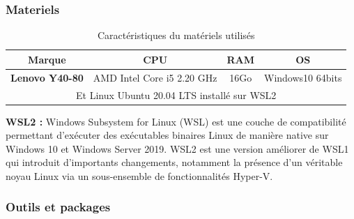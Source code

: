 \subsubsection{Materiels}

\begin{table}[H]
  \centering
  \begin{tabular}{cccc}
    \toprule
     \textbf{Marque} & \textbf{CPU} & \textbf{RAM} & \textbf{OS} \\
     \midrule
       \textbf{Lenovo Y40-80} & AMD Intel Core i5 2.20 GHz & 16Go & Windows10 64bits \\ \hline
       \multicolumn{4}{m{14cm}}{\centering Et Linux Ubuntu 20.04 LTS installé sur WSL2 }\\
    \bottomrule
  \end{tabular}
  \caption{Caractéristiques du matériels utilisés}
  \label{tabmat}
\end{table}

\textbf{WSL2 :} Windows Subsystem for Linux (WSL) est une couche de compatibilité permettant d'exécuter des exécutables binaires Linux de manière native sur Windows 10 et Windows Server 2019. WSL2 est une version améliorer de WSL1 qui introduit d'importants changements, notamment la présence d'un véritable noyau Linux \cite{craigloewen_msft} via un sous-ensemble de fonctionnalités Hyper-V. 

\subsubsection{Outils et packages}

